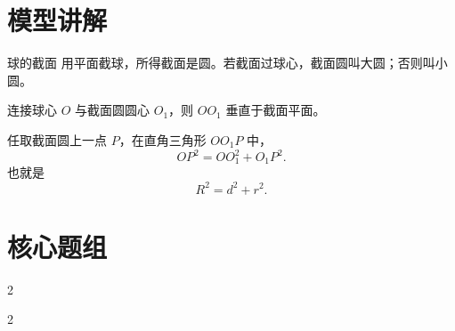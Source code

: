 \documentclass[11pt,a4paper]{ctexart}
\begin{document}
\section{模型讲解}

\begin{teachbox}{球的截面}
用平面截球，所得截面是圆。若截面过球心，截面圆叫大圆；否则叫小圆。

连接球心 $O$ 与截面圆圆心 $O_1$，则 $OO_1$ 垂直于截面平面。

任取截面圆上一点 $P$，在直角三角形 $OO_1P$ 中，
\[
  OP^2=OO_1^2+O_1P^2.
\]
也就是
\[
  R^2=d^2+r^2.
\]
\begin{center}
  \qSolidSphereSectionRatioFigure[1.1]
\end{center}
\end{teachbox}

\newpage
\section{核心题组}

{\small \qSolidSphereSectionRatioStem}
\begin{center}
  \qSolidSphereSectionRatioFigure
\end{center}

\begin{paracol}{2}
\switchcolumn
{}
\end{paracol}

\par\vspace{1.0em}\par\vspace{1.0em}

{\small \qSolidPrismSphereSectionStem}
\begin{center}
  \qSolidPrismSphereSectionFigure[1.1]
\end{center}

\begin{paracol}{2}
\switchcolumn
{}
\end{paracol}
\end{document}
